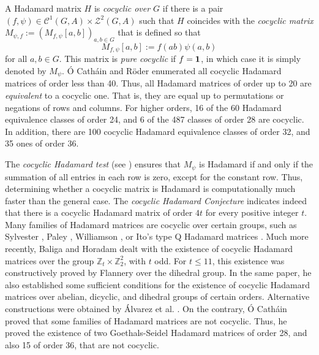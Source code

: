 \documentclass[11pt,a4paper]{article}
\begin{document}
A Hadamard matrix $H$ is {\em cocyclic over $G$} if there is a pair $(f,\psi)\in \mathcal{C}^1(G,A)\times \mathcal{Z}^2(G,A)$ such that $H$ coincides with the {\em cocyclic matrix} $M_{\psi,f}:=\left(M_{f,\psi}[a,b]\right)_{a,b\in G}$ that is defined so that
\begin{equation}\label{eq:cocyclicHM}
M_{f,\psi}[a,b]:=f(ab)\psi(a,b)
\end{equation}
for all $a,b\in G$. This matrix is {\em pure cocyclic} if $f={\bf 1}$, in which case it is simply denoted by $M_\psi$. \'O Cath\'ain and R\"oder \citep{OC11} enumerated all cocyclic Hadamard matrices of order less than 40. Thus, all Hadamard matrices of order up to 20 are {\em equivalent} to a cocyclic one. That is, they are equal up to permutations or negations of rows and columns. For higher orders, 16 of the 60 Hadamard equivalence classes of order 24, and 6 of the 487 classes of order 28 are cocyclic. In addition, there are 100 cocyclic Hadamard equivalence classes of order 32, and 35 ones of order 36.

The {\em cocyclic Hadamard test} (see \citealp{HdL95}) ensures that $M_\psi$ is Hadamard if and only if the summation of all entries in each row is zero, except for the constant row. Thus, determining whether a cocyclic matrix is Hadamard is computationally much faster than the general case. The {\em cocyclic Hadamard Conjecture} indicates indeed that there is a cocyclic Hadamard matrix of order $4t$ for every positive integer $t$. Many families of Hadamard matrices are cocyclic over certain groups, such as Sylvester \citep{Sylvester1867}, Paley \citep{Paley1933}, Williamson \citep{Williamson1944}, or Ito's type Q Hadamard matrices \citep{Ito1997}. Much more recently, Baliga and Horadam \citep{Baliga1995} dealt with the existence of cocyclic Hadamard matrices over the group $\mathbb{Z}_t\times\mathbb{Z}_2^2$, with $t$ odd. For $t\leq 11$, this existence was constructively proved by Flannery \citep{Flannery1997} over the dihedral group. In the same paper, he also established some sufficient conditions for the existence of cocyclic Hadamard matrices over abelian, dicyclic, and dihedral groups of certain orders. Alternative constructions were obtained by \'Alvarez et al. \citep{Alvarez2016}. On the contrary, \'O Cath\'ain \citep{OC08} proved that some families of Hadamard matrices are not cocyclic. Thus, he proved the existence of two Goethals-Seidel Hadamard matrices \citep{GS67} of order 28, and also 15 of order 36, that are not cocyclic.
\end{document}
